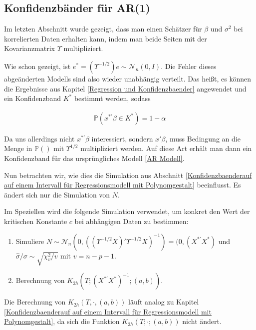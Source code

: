 \documentclass[12pt,a4paper]{article}
\theoremstyle{definition}
\theoremstyle{definition}
\theoremstyle{definition}
\theoremstyle{definition}
\begin{document}
\subsection{Konfidenzbänder für AR(1)}
\label{Konfidenzbaender für AR(1)}
Im letzten Abschnitt wurde gezeigt, dass man einen Schätzer für $\beta$ und $\sigma^2$ bei korrelierten Daten erhalten kann, indem man beide Seiten mit der Kovarianzmatrix $\Upsilon$ multipliziert. 

Wie schon gezeigt, ist $e^{*} = (\Upsilon^{-1/2})e \sim \mathscr{N}_{n}(0,I)$. Die Fehler dieses abgeänderten Modells sind also wieder unabhängig verteilt. Das heißt, es können die Ergebnisse aus Kapitel \ref{Regression und Konfidenzbaender} angewendet und ein Konfidenzband $K^{*}$ bestimmt werden, sodass

\begin{align*}
\mathbb{P}(x^{*'} \beta \in K^{*}) = 1 - \alpha
\end{align*}

Da uns allerdings nicht $x^{*'} \beta$ interessiert, sondern $x' \beta$, muss Bedingung an die Menge in $\mathbb{P}()$ mit $\Upsilon^{1/2}$ multipliziert werden. Auf diese Art erhält man dann ein Konfidenzband für das ursprüngliches Modell \eqref{AR Modell}.

Nun betrachten wir, wie dies die Simulation aus Abschnitt \ref{Konfidenzbaenderauf auf einem Intervall für Regressionsmodell mit Polynomgestalt} beeinflusst. Es ändert sich nur die Simulation von $N$.

Im Speziellen wird die folgende Simulation verwendet, um konkret den Wert der kritischen Konstante $c$ bei abhängigen Daten zu bestimmen:

\begin{enumerate}
\item Simuliere $N \sim \mathscr{N}_{n}(0,((\Upsilon^{-1/2}X)'\Upsilon^{-1/2}X)^{-1}) = (0,(X^{*'}X^{*})$ und $\hat{\sigma}/\sigma \sim \sqrt{\chi^2_v/v}$ mit $v=n-p-1$.
\item Berechnung von $K_{2h}(T;(X^{*'}X^{*})^{-1};(a,b))$.
\end{enumerate}

Die Berechnung von $K_{2h}(T,\cdot,(a,b))$ läuft analog zu Kapitel \ref{Konfidenzbaenderauf auf einem Intervall für Regressionsmodell mit Polynomgestalt}, da sich die Funktion $K_{2h}(T;\cdot;(a,b))$ nicht ändert.
\end{document}
